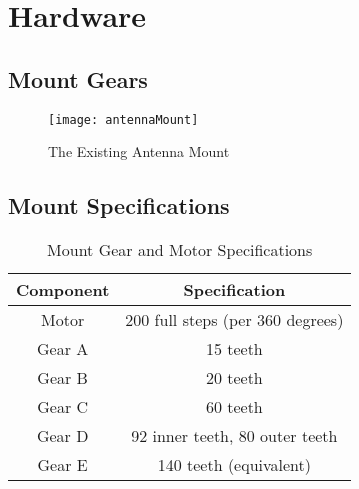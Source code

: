 \chapter{Hardware}

\section{Mount Gears}
\begin{figure}[!htb]
  \centering
  \texttt{[image: antennaMount]}
  \caption{The Existing Antenna Mount}
  \label{fig:antennaMount}
\end{figure}
\newpage

\section{Mount Specifications}\label{sec:appendix_mount_specifications}
\begin{table}[!htb]
  \centering
  \renewcommand{\arraystretch}{1.2}
  \begin{tabular}{ |c|c| }
  \hline
  \textbf{Component}        & \textbf{Specification}    \\
  \hline
  Motor         & 200 full steps (per 360 degrees) \\ \hline
  Gear A        & 15 teeth \\ \hline
  Gear B        & 20 teeth \\ \hline
  Gear C        & 60 teeth \\ \hline
  Gear D        & 92 inner teeth, 80 outer teeth \\ \hline
  Gear E        & 140 teeth (equivalent) \\ \hline
  \end{tabular}
  \caption{Mount Gear and Motor Specifications}
  \label{tab:mount_specifications}
\end{table}

